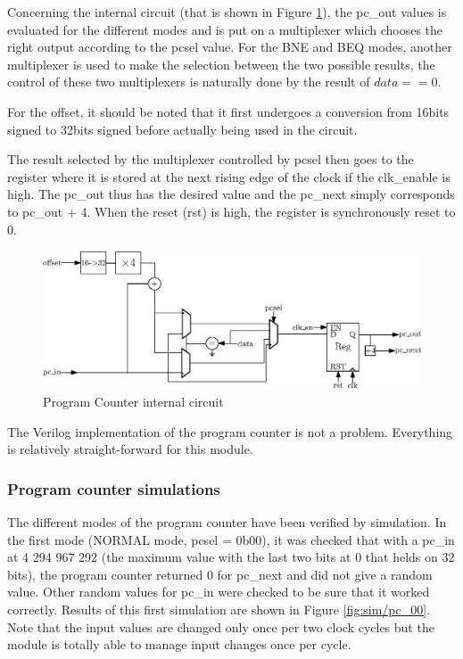 Concerning the internal circuit (that is shown in Figure \ref{fig:components/pc_in}), the pc\_out 
values is evaluated for the different modes and 
is put on a multiplexer which chooses the right output according to the pcsel value. For the BNE 
and BEQ modes, another multiplexer is used to make the selection between the two possible results, 
the control of these two multiplexers is naturally done by the result of $data == 0$. 

For the offset, it should be noted that it first undergoes a conversion from 16bits signed to 32bits 
signed before actually being used in the circuit.

The result selected by the multiplexer controlled by pcsel then goes to the register where it is 
stored at the next rising edge of the clock if the clk\_enable is high. The 
pc\_out thus has the desired value and the pc\_next simply corresponds to pc\_out + 4. When 
the reset (rst) is high, the register is synchronously reset to 0.

\begin{figure}[H]
    \centering
    \includegraphics[width=\linewidth]{Chapter3-CPU/res/pc_internal}
    \caption{Program Counter internal circuit}
    \label{fig:components/pc_in}
\end{figure}

The Verilog implementation of the program counter is not a problem. Everything is relatively 
straight-forward for this module.

\subsubsection*{Program counter simulations}

The different modes of the program counter have been verified by simulation. In the first mode 
(NORMAL mode, pcsel = 0b00), it was checked that with a pc\_in at 4 294 967 292 (the maximum value with 
the last two bits at 0 that helds on 32 bits), the program counter returned 0 for pc\_next and did not 
give a random value. Other random values for pc\_in were checked to be sure that it worked 
correctly. Results of this first simulation are shown in Figure \ref{fig:sim/pc_00}. Note that the
input values are changed only once per two clock cycles but the module is totally able to manage
input changes once per cycle.

